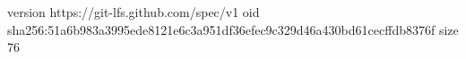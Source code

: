 version https://git-lfs.github.com/spec/v1
oid sha256:51a6b983a3995ede8121e6c3a951df36efec9c329d46a430bd61cecffdb8376f
size 76
